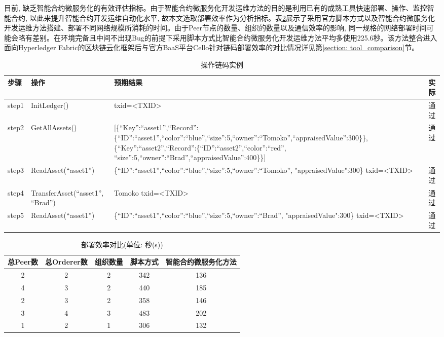 目前, 缺乏智能合约微服务化的有效评估指标。由于智能合约微服务化开发运维方法的目的是利用已有的成熟工具快速部署、操作、监控智能合约, 以此来提升智能合约开发运维自动化水平, 故本文选取部署效率作为分析指标。表\ref{experimental_results_of_smart contract_micro_service}展示了采用官方脚本方式以及智能合约微服务化开发运维方法搭建、部署不同网络规模所消耗的时间。由于Peer节点的数量、组织的数量以及通信效率的影响, 同一规格的网络部署时间可能会略有差别。在环境完备且中间不出现Bug的前提下采用脚本方式比智能合约微服务化开发运维方法平均多使用225.6秒。该方法整合进入面向Hyperledger Fabric的区块链云化框架后与官方BaaS平台Cello针对链码部署效率的对比情况详见第\ref{section: tool_comparison}节。

{\footnotesize
\begin{longtable}[h]{l m{90pt} m{210pt} l}
    \caption[操作链码实例]{操作链码实例} \label{operator_chaincode}\\
        \toprule  
        \textbf{步骤}&\textbf{操作}&\textbf{预期结果}&\textbf{实际}\\
        \hline
        step1 & InitLedger() & txid=<TXID> & 通过 \\
        \hline
        step2 & GetAllAssets() & [\{“Key”:“asset1”,“Record”:\{“ID”:“asset1”,“color”:“blue”,“size”:5,“owner”:“Tomoko”,“appraisedValue”:300\}\}, 
        \newline \{“Key”:“asset2”,“Record”:\{“ID”:“asset2”,“color”:“red”, “size”:5,“owner”:“Brad”,“appraisedValue”:400\}\}] & 通过 \\
        \hline
        step3 & ReadAsset(“asset1”) & \{“ID”:“asset1”,“color”:“blue”,“size”:5,“owner”:“Tomoko”,
        "appraisedValue":300\} txid=<TXID> & 通过 \\
        \hline
        step4 & TransferAsset(“asset1”, “Brad”) & Tomoko txid=<TXID>   & 通过 \\
        \hline
        step5 & ReadAsset(“asset1”) & \{“ID”:“asset1”,“color”:“blue”,“size”:5,“owner”:“Brad”,
        "appraisedValue":300\} txid=<TXID>  & 通过 \\
        \bottomrule
        
    \end{longtable} 
}

{\footnotesize
\begin{longtable}[h]{ccccc}
    \caption[部署效率对比(单位: 秒(s))]{部署效率对比(单位: 秒(s))} \label{experimental_results_of_smart contract_micro_service}\\
        \toprule  
        \textbf{总Peer数}&\textbf{总Orderer数}&\textbf{组织数量}&\textbf{脚本方式}&\textbf{智能合约微服务化方法}\\
        \hline
        2 & 2 & 2 & 342 & 136\\
        4 & 3 & 2 & 440 & 185\\
        2 & 3 & 2 & 358 & 146\\
        3 & 4 & 3 & 483 & 202\\
        1 & 2 & 1 & 306 & 132\\
        \bottomrule
    \end{longtable} 
}

